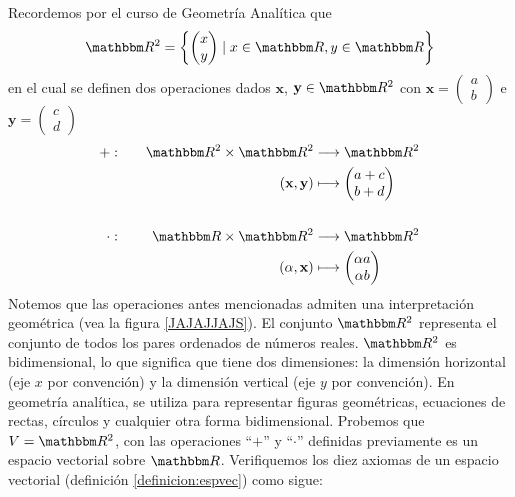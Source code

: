 \begin{examplebox}{}{}
    Recordemos por el curso de Geometría Analítica que
    $$\RR[2] = \left\{ \begin{pmatrix}
        x \\
        y
    \end{pmatrix} \mid x \in \RR, y \in \RR \right\}$$
    en el cual se definen dos operaciones dados $\mathbf{x}$, $\mathbf{y} \in \RR[2]$ con $\mathbf{x} = \begin{pmatrix}
        a \\
        b
    \end{pmatrix}$ e $\mathbf{y} = \begin{pmatrix}
        c \\
        d
    \end{pmatrix}$
    \begin{alignat*}{2}
        + &: & \quad \RR[2] \times \RR[2] & \longrightarrow \RR[2] \\
        & & (\mathbf{x}, \mathbf{y}) & \longmapsto \begin{pmatrix}
            a + c \\
            b + d
        \end{pmatrix} \\
        & \\
        \cdot &: & \quad \RR \times \RR[2] & \longrightarrow \RR[2] \\
        & & (\alpha, \mathbf{x}) & \longmapsto \begin{pmatrix}
            \alpha a \\
            \alpha b
        \end{pmatrix}
    \end{alignat*}
    Notemos que las operaciones antes mencionadas admiten una interpretación geométrica (vea la figura \ref{JAJAJJAJS}). El conjunto $\RR[2]$ representa el conjunto de todos los pares ordenados de números reales. $\RR[2]$ es bidimensional, lo que significa que tiene dos dimensiones: la dimensión horizontal (eje $x$ por convención) y la dimensión vertical (eje $y$ por convención). En geometría analítica, se utiliza para representar figuras geométricas, ecuaciones de rectas, círculos y cualquier otra forma bidimensional. Probemos que $V = \RR[2]$, con las operaciones “$+$” y “$\cdot$” definidas previamente es un espacio vectorial sobre $\RR$. Verifiquemos los diez axiomas de un espacio vectorial (definición \ref{definicion:espvec}) como sigue:
    \begin{enumerate}[label=\roman*), topsep=6pt, itemsep=0pt]

\end{enumerate}
\end{examplebox}

